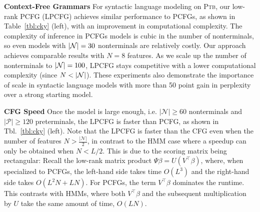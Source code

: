 \documentclass{article}
\begin{document}

\textbf{Context-Free Grammars}
For syntactic language modeling on \textsc{Ptb}, our low-rank PCFG (LPCFG) achieves similar performance to PCFGs, as shown in Table~\ref{tbl:cky} (left), with an improvement in computational complexity. The complexity of inference in PCFGs models is cubic in the number of nonterminals, so even models with $|\mathcal{N}|=30$ nonterminals are relatively
costly. Our approach achieves comparable results with $N=8$ features. As we scale up the number of nonterminals to $|\mathcal{N}| = 100$, LPCFG stays competitive with a lower computational complexity (since $N < |\mathcal{N}|$). These experiments also demonstrate the importance of scale in syntactic language models with more than 50 point gain in perplexity over a strong starting model.

\textbf{CFG Speed}
Once the model is large enough, i.e. $|\mathcal{N}|\ge 60$ nonterminals and
$|\mathcal{P}|\ge 120$ preterminals, the LPCFG is faster than PCFG,
as shown in Tbl.~\ref{tbl:cky} (left).
Note that the LPCFG is faster than the CFG even when the number of features
$N>\frac{|\mathcal{N}|}{2}$, in contrast to the HMM case where a speedup can only
be obtained when $N < L/2$.
This is due to the scoring matrix being rectangular:
Recall the low-rank matrix product
$\Psi\beta = U(V^\top\beta)$, where,
when specialized to PCFGs, the left-hand side takes time $O(L^{3})$
and the right-hand side takes $O(L^{2}N + LN)$.
For PCFGs, the term $V^\top\beta$ dominates the runtime.
This contrasts with HMMs, where both $V^\top\beta$ and the subsequent multiplication
by $U$ take the same amount of time, $O(LN)$.
\end{document}
